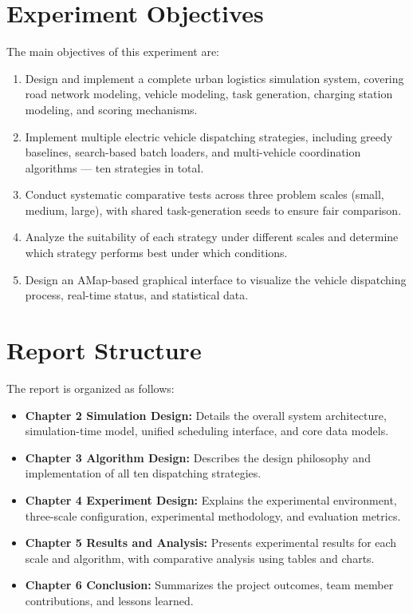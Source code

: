 \section{Experiment Objectives}

The main objectives of this experiment are:

\begin{enumerate}[leftmargin=4em]
    \item Design and implement a complete urban logistics simulation system, covering road network modeling, vehicle modeling, task generation, charging station modeling, and scoring mechanisms.
    \item Implement multiple electric vehicle dispatching strategies, including greedy baselines, search-based batch loaders, and multi-vehicle coordination algorithms --- ten strategies in total.
    \item Conduct systematic comparative tests across three problem scales (small, medium, large), with shared task-generation seeds to ensure fair comparison.
    \item Analyze the suitability of each strategy under different scales and determine which strategy performs best under which conditions.
    \item Design an AMap-based graphical interface to visualize the vehicle dispatching process, real-time status, and statistical data.
\end{enumerate}

\section{Report Structure}

The report is organized as follows:

\begin{itemize}[leftmargin=4em]
    \item \textbf{Chapter 2 Simulation Design:} Details the overall system architecture, simulation-time model, unified scheduling interface, and core data models.
    \item \textbf{Chapter 3 Algorithm Design:} Describes the design philosophy and implementation of all ten dispatching strategies.
    \item \textbf{Chapter 4 Experiment Design:} Explains the experimental environment, three-scale configuration, experimental methodology, and evaluation metrics.
    \item \textbf{Chapter 5 Results and Analysis:} Presents experimental results for each scale and algorithm, with comparative analysis using tables and charts.
    \item \textbf{Chapter 6 Conclusion:} Summarizes the project outcomes, team member contributions, and lessons learned.
\end{itemize}
